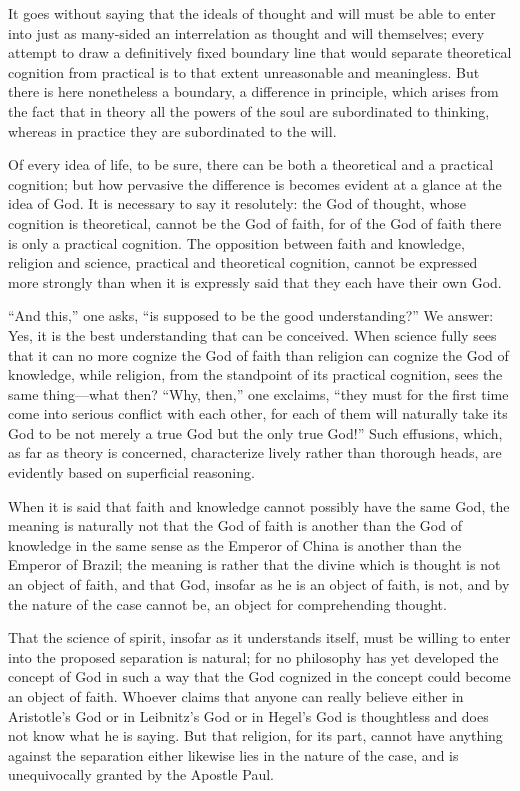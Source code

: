 \documentclass[12pt,a4paper]{article}
\newcommand{\opage}[1]{\marginnote{\footnotesize\textit{[#1]}}}
\begin{document}
It goes without saying that the ideals of thought and will must be
able to enter into just as many-sided an interrelation as thought and
will themselves; every attempt to draw a definitively fixed boundary
line that would separate theoretical cognition from practical is to
that extent unreasonable and meaningless. But there is here
nonetheless a boundary, a difference in principle, which arises from
the fact that in theory all the powers of the soul are subordinated to
thinking, whereas in practice they are subordinated to the will.

Of every idea of life, to be sure, there can be both a theoretical and
a practical cognition; but how
\opage{73}pervasive the difference is becomes evident at a glance at
the idea of God. It is necessary to say it resolutely: the God of
thought, whose cognition is theoretical, cannot be the God of faith,
for of the God of faith there is only a practical cognition. The
opposition between faith and knowledge, religion and science,
practical and theoretical cognition, cannot be expressed more strongly
than when it is expressly said that they each have their own God.

``And this,'' one asks, ``is supposed to be the good understanding?''
We answer: Yes, it is the best understanding that can be conceived.
When science fully sees that it can no more cognize the God of faith
than religion can cognize the God of knowledge, while religion, from
the standpoint of its practical cognition, sees the same thing---what
then? ``Why, then,'' one exclaims, ``they must for the first time come
into serious conflict with each other, for each of them will naturally
take its God to be not merely a true God but the only true God!'' Such
effusions, which, as far as theory is concerned, characterize lively
rather than thorough heads, are evidently based on superficial
reasoning.

When it is said that faith and knowledge cannot possibly have the same
God, the meaning is naturally not that the God of faith is another
than the God of knowledge in the same sense as the Emperor of China is
another than the Emperor of Brazil; the meaning is rather that the
divine which is thought is not an object of faith, and that God,
insofar as he is an object of faith, is not, and by the nature of the
case cannot be, an object for comprehending thought.

That the science of spirit, insofar as it understands itself, must be
willing to enter into the proposed separation is natural; for no
philosophy has yet developed the concept of God in such a way that the
God cognized in the concept could become an object of faith. Whoever
claims that anyone can really believe either in
\opage{74}Aristotle's God or in Leibnitz's God or in Hegel's God is
thoughtless and does not know what he is saying. But that religion,
for its part, cannot have anything against the separation either
likewise lies in the nature of the case, and is unequivocally granted
by the Apostle Paul.
\end{document}

